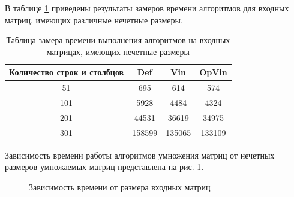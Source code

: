 \documentclass[12pt]{report}
\begin{document}
	
	В таблице \ref{table:t2} приведены результаты замеров времени алгоритмов для входных матриц, имеющих различные нечетные размеры.
	
	\begin{table} [H]
		\caption{Таблица замера времени выполнения алгоритмов на входных матрицах, имеющих нечетные размеры}
		\label{table:t2}
		\begin{center}
			\begin{tabular}{|c | c | c | c |}
				
				\hline
				
				Количество строк и столбцов & Def & Vin & OpVin \\ [0.5ex]
				
				\hline
				
				51 & 695 & 614 & 574 \\ 
				
				\hline 
				
				101 & 5928 & 4484 & 4324\\ 
				
				\hline 
				
				201 & 44531 & 36619 & 34975\\ 
				
				\hline 
				
				301 & 158599 & 135065 & 133109\\ 
				
				\hline 
			\end{tabular}
		\end{center}
	\end{table}

	Зависимость времени работы алгоритмов умножения матриц от нечетных размеров умножаемых матриц представлена на рис. \ref{ris2}.

	\begin{center}
		\begin{figure}[H]
		\center
		\caption{Зависимость времени от размера входных матриц}
		\label{ris2}
		\end{figure}
	\end{center}
	
\end{document}
